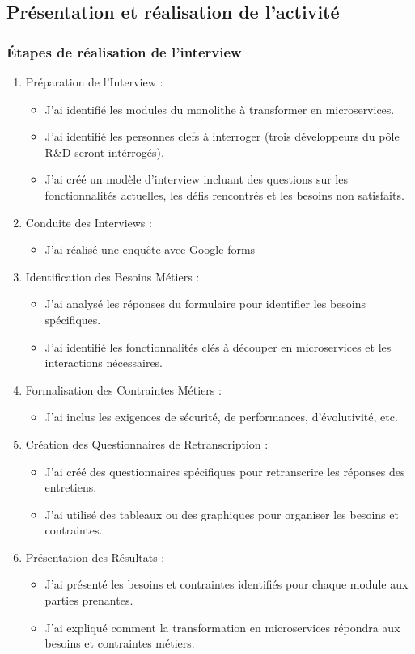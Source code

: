 \documentclass[a4paper, 11pt]{report}
\begin{document}
\subsection{Présentation et réalisation de l'activité}
\subsubsection{Étapes de réalisation de l'interview}
\begin{enumerate}
  \item Préparation de l'Interview :
  \begin{itemize}
    \item J'ai identifié les modules du monolithe à transformer en microservices.
    \item J'ai identifié les personnes clefs à interroger (trois développeurs du pôle R\&D seront intérrogés).
    \item J'ai créé un modèle d'interview incluant des questions sur les fonctionnalités actuelles, les défis rencontrés et les besoins non satisfaits.
  \end{itemize}
   \item Conduite des Interviews :
  \begin{itemize}
    \item J'ai réalisé une enquête avec Google forms
  \end{itemize}
  \item Identification des Besoins Métiers :
  \begin{itemize}
    \item J'ai analysé les réponses du formulaire pour identifier les besoins spécifiques.
    \item J'ai identifié les fonctionnalités clés à découper en microservices et les interactions nécessaires.
  \end{itemize}
  \item Formalisation des Contraintes Métiers :
  \begin{itemize}
    \item J'ai inclus les exigences de sécurité, de performances, d'évolutivité, etc.
  \end{itemize}
  \item Création des Questionnaires de Retranscription :
  \begin{itemize}
    \item J'ai créé des questionnaires spécifiques pour retranscrire les réponses des entretiens.
    \item J'ai utilisé des tableaux ou des graphiques pour organiser les besoins et contraintes.
  \end{itemize}
  \item Présentation des Résultats :
  \begin{itemize}
    \item J'ai présenté les besoins et contraintes identifiés pour chaque module aux parties prenantes.
    \item J'ai expliqué comment la transformation en microservices répondra aux besoins et contraintes métiers.
  \end{itemize}
\end{enumerate}
\end{document}
